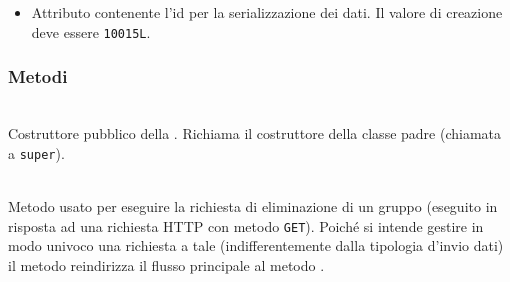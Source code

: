 \begin{itemize}
	\item{}
	Attributo contenente l'id per la serializzazione dei dati. Il valore di creazione deve essere \texttt{10015L}.
\end{itemize}

\subsubsection*{Metodi}

\begin{description}
	\item{}\\
	Costruttore pubblico della . Richiama il costruttore della classe padre (chiamata a \texttt{super}).
	
	\item{}\\
	Metodo usato per eseguire la richiesta di eliminazione di un gruppo (eseguito in risposta ad una richiesta HTTP con metodo \texttt{GET}). Poiché si intende gestire in modo univoco una richiesta a tale  (indifferentemente dalla tipologia d'invio dati) il metodo reindirizza il flusso principale al metodo .
	

\end{description}
